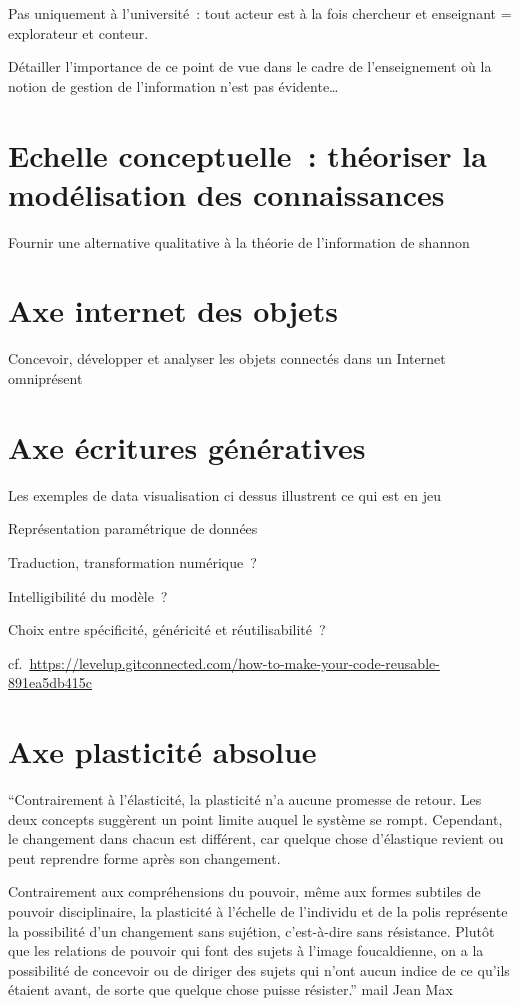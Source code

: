 \documentclass[
  a4paper,
  DIV=11,
  numbers=noendperiod]{scrreprt}
\begin{document}
Pas uniquement à l'université~: tout acteur est à la fois chercheur et
enseignant = explorateur et conteur.

Détailler l'importance de ce point de vue dans le cadre de
l'enseignement où la notion de gestion de l'information n'est pas
évidente\ldots{}

\section{Echelle conceptuelle~: théoriser la modélisation des
connaissances}\label{sec-echelleConcetuelle}

Fournir une alternative qualitative à la théorie de l'information de
shannon

\section{Axe internet des objets}\label{sec-axeIOT}

Concevoir, développer et analyser les objets connectés dans un Internet
omniprésent

\section{Axe écritures génératives}\label{sec-axeGeneratif}

Les exemples de data visualisation ci dessus illustrent ce qui est en
jeu

Représentation paramétrique de données

Traduction, transformation numérique~?

Intelligibilité du modèle~?

Choix entre spécificité, généricité et réutilisabilité~?

cf.~\url{https://levelup.gitconnected.com/how-to-make-your-code-reusable-891ea5db415c}

\section{Axe plasticité absolue}\label{sec-axePlasticite}

``Contrairement à l'élasticité, la plasticité n'a aucune promesse de
retour. Les deux concepts suggèrent un point limite auquel le système se
rompt. Cependant, le changement dans chacun est différent, car quelque
chose d'élastique revient ou peut reprendre forme après son changement.

Contrairement aux compréhensions du pouvoir, même aux formes subtiles de
pouvoir disciplinaire, la plasticité à l'échelle de l'individu et de la
polis représente la possibilité d'un changement sans sujétion,
c'est-à-dire sans résistance. Plutôt que les relations de pouvoir qui
font des sujets à l'image foucaldienne, on a la possibilité de concevoir
ou de diriger des sujets qui n'ont aucun indice de ce qu'ils étaient
avant, de sorte que quelque chose puisse résister.'' mail Jean Max
\end{document}
